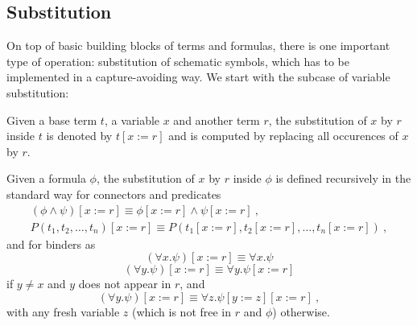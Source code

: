 \subsection{Substitution}
\label{subsec:substitution}
On top of basic building blocks of terms and formulas, there is one important type of operation: substitution of schematic symbols, which has to be implemented in a capture-avoiding way. We start with the subcase of variable substitution:
\begin{definition}
  Given a base term $t$, a variable $x$ and another term $r$, the substitution of $x$ by $r$ inside $t$ is denoted by $ t[x := r] $ and is computed by replacing all occurences of $x$ by $r$.

  Given a formula $\phi$, the substitution of $x$ by $r$ inside $\phi$ is defined recursively in the standard way for connectors and predicates
  \begin{gather*}
    (\phi \land \psi)[x := r] \equiv \phi[x := r] \land \psi[x := r]~,\\
    P(t_1, t_2, \ldots, t_n)[x := r] \equiv P(t_1[x := r], t_2[x := r], \ldots, t_n[x := r])~,
  \end{gather*}
  and for binders as
  $$
  (\forall x. \psi)[x := r] \equiv \forall x. \psi
  $$
  $$
  (\forall y. \psi)[x := r] \equiv \forall y. \psi[x := r]
  $$
  if $y \neq x$ and $y$ does not appear in $r$, and
  $$
  (\forall y. \psi)[x := r] \equiv \forall z. \psi[y := z][x := r]~,
  $$
  with any fresh variable $z$ (which is not free in $r$ and $\phi$) otherwise.
\end{definition}

